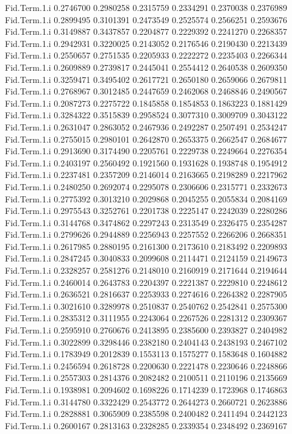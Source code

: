 \documentclass[11pt]{article} %
\begin{document}
\begin{Schunk}
\begin{Soutput}
Fid.Term.1.i 0.2746700 0.2980258 0.2315759 0.2334291 0.2370038 0.2376989
Fid.Term.1.i 0.2899495 0.3101391 0.2473549 0.2525574 0.2566251 0.2593676
Fid.Term.1.i 0.3149887 0.3437857 0.2204877 0.2229392 0.2241270 0.2268357
Fid.Term.1.i 0.2942931 0.3220025 0.2143052 0.2176546 0.2190430 0.2213439
Fid.Term.1.i 0.2550657 0.2751535 0.2205933 0.2222272 0.2235403 0.2266344
Fid.Term.1.i 0.2609889 0.2739817 0.2445041 0.2554412 0.2640538 0.2609350
Fid.Term.1.i 0.3259471 0.3495402 0.2617721 0.2650180 0.2659066 0.2679811
Fid.Term.1.i 0.2768967 0.3012485 0.2447659 0.2462068 0.2468846 0.2490567
Fid.Term.1.i 0.2087273 0.2275722 0.1845858 0.1854853 0.1863223 0.1881429
Fid.Term.1.i 0.3284322 0.3515839 0.2958524 0.3077310 0.3009709 0.3043122
Fid.Term.1.i 0.2631047 0.2863052 0.2467936 0.2492287 0.2507491 0.2534247
Fid.Term.1.i 0.2755015 0.2980101 0.2642870 0.2653375 0.2662547 0.2684677
Fid.Term.1.i 0.2913690 0.3174490 0.2205761 0.2229738 0.2249664 0.2276354
Fid.Term.1.i 0.2403197 0.2560492 0.1921560 0.1931628 0.1938748 0.1954912
Fid.Term.1.i 0.2237481 0.2357209 0.2146014 0.2163665 0.2198289 0.2217962
Fid.Term.1.i 0.2480250 0.2692074 0.2295078 0.2306606 0.2315771 0.2332673
Fid.Term.1.i 0.2775392 0.3013210 0.2029868 0.2045255 0.2055834 0.2084169
Fid.Term.1.i 0.2975543 0.3252761 0.2201738 0.2225147 0.2242039 0.2280286
Fid.Term.1.i 0.3144768 0.3474862 0.2297243 0.2313549 0.2326475 0.2354287
Fid.Term.1.i 0.2799626 0.2944889 0.2256943 0.2257552 0.2266206 0.2668351
Fid.Term.1.i 0.2617985 0.2880195 0.2161300 0.2173610 0.2183492 0.2209893
Fid.Term.1.i 0.2847245 0.3040833 0.2099608 0.2114471 0.2124159 0.2149673
Fid.Term.1.i 0.2328257 0.2581276 0.2148010 0.2160919 0.2171644 0.2194644
Fid.Term.1.i 0.2460014 0.2643783 0.2204397 0.2221387 0.2229810 0.2248612
Fid.Term.1.i 0.2636521 0.2816637 0.2253933 0.2274616 0.2264382 0.2287905
Fid.Term.1.i 0.3021610 0.3289978 0.2510837 0.2540762 0.2542841 0.2575300
Fid.Term.1.i 0.2835312 0.3111955 0.2243064 0.2267526 0.2281312 0.2309367
Fid.Term.1.i 0.2595910 0.2760676 0.2413895 0.2385600 0.2393827 0.2404982
Fid.Term.1.i 0.3022899 0.3298446 0.2382180 0.2404143 0.2438193 0.2467102
Fid.Term.1.i 0.1783949 0.2012839 0.1553113 0.1575277 0.1583648 0.1604882
Fid.Term.1.i 0.2456594 0.2618728 0.2200630 0.2221478 0.2230646 0.2248866
Fid.Term.1.i 0.2557303 0.2814376 0.2082482 0.2100511 0.2110196 0.2135669
Fid.Term.1.i 0.1938981 0.2094602 0.1698226 0.1714239 0.1723968 0.1746863
Fid.Term.1.i 0.3144780 0.3322429 0.2543772 0.2644273 0.2660721 0.2623886
Fid.Term.1.i 0.2828881 0.3065909 0.2385598 0.2400482 0.2411494 0.2442123
Fid.Term.1.i 0.2600167 0.2813163 0.2328285 0.2339354 0.2348492 0.2369167

\end{Soutput}
\end{Schunk}
\end{document}
